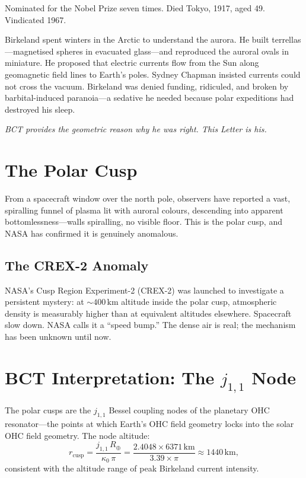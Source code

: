 \documentclass[aps,prl,twocolumn,superscriptaddress,floatfix]{revtex4-2}
\begin{document}
\noindent Nominated for the Nobel Prize seven times.
Died Tokyo, 1917, aged 49. Vindicated 1967.

Birkeland spent winters in the Arctic to understand the aurora. He
built terrellas---magnetised spheres in evacuated glass---and
reproduced the auroral ovals in miniature. He proposed that electric
currents flow from the Sun along geomagnetic field lines to Earth's
poles. Sydney Chapman insisted currents could not cross the vacuum.
Birkeland was denied funding, ridiculed, and broken by
barbital-induced paranoia---a sedative he needed because polar
expeditions had destroyed his sleep.

\textit{BCT provides the geometric reason why he was right. This
Letter is his.}

\section{The Polar Cusp}

From a spacecraft window over the north pole, observers have reported
a vast, spiralling funnel of plasma lit with auroral colours, descending
into apparent bottomlessness---walls spiralling, no visible floor.
This is the polar cusp, and NASA has confirmed it is genuinely
anomalous.

\subsection{The CREX-2 Anomaly}

NASA's Cusp Region Experiment-2 (CREX-2) was launched to investigate
a persistent mystery: at ${\sim}400\,\mathrm{km}$ altitude inside the
polar cusp, atmospheric density is measurably higher than at equivalent
altitudes elsewhere. Spacecraft slow down. NASA calls it a ``speed
bump.'' The dense air is real; the mechanism has been unknown until now.

\section{BCT Interpretation: The $j_{1,1}$ Node}

The polar cusps are the $j_{1,1}$ Bessel coupling nodes of the
planetary OHC resonator---the points at which Earth's OHC field
geometry locks into the solar OHC field geometry. The node altitude:
\begin{equation}
r_\mathrm{cusp}
= \frac{j_{1,1}\,R_\oplus}{\kappa_0\,\pi}
= \frac{2.4048 \times 6371\,\mathrm{km}}{3.39 \times \pi}
\approx 1440\,\mathrm{km},
\label{eq:cusp}
\end{equation}
consistent with the altitude range of peak Birkeland current
intensity.
\end{document}
